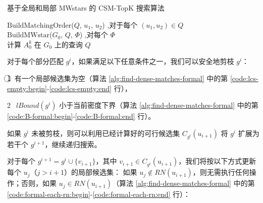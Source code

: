 \begin{algorithm}[H]
    \small
    \caption{基于全局和局部 MWstars 的 CSM-TopK 搜索算法}
    \label{alg:localmwstar:framework}
    $\mathrm{BuildMatchingOrder}$($Q$, $u_1$, $u_2$) ,对于每个 $(u_1, u_2) \in Q$ \\
    $\mathrm{BuildMWstar}$($G_0$, $Q$, $\Phi$) ,对每个 $\Phi$  \\
    计算 $A_0^k$ 在 $G_0$ 上的查询 $Q$ \\
    \end{algorithm}

对于每个部分匹配 $g^i$，如果满足以下任意条件之一，我们可以安全地剪枝 $g^i$：

\textcircled{1}~有一个局部候选集为空（算法 \ref{alg:find-dense-matches-formal} 中的第 \ref{code:lcs-empty:begin}-\ref{code:lcs-empty:end} 行），

\textcircled{2}~$lBound(g^i)$ 小于当前密度下界（算法 \ref{alg:find-dense-matches-formal} 中的第 \ref{code:B-formal:begin}-\ref{code:B-formal:end} 行）。

如果 $g^i$ 未被剪枝，则可以利用已经计算好的可行候选集 $C_{g^i}(u_{i+1})$ 将 $g^i$ 扩展为若干个 $g^{i+1}$，继续递归搜索。

对于每个 $g^{i+1} = g^i \cup \{v_{i+1}\}$，其中 $v_{i+1} \in C_{g^i}(u_{i+1})$，我们将按以下方式更新每个 $u_j$（$j > i+1$）的局部候选集：
如果 $u_j \notin RN(u_{i+1})$，则无需执行任何操作；否则，如果 $u_j \in RN(u_{i+1})$（算法 \ref{alg:find-dense-matches-formal} 中的第 \ref{code:formal-each-rn:begin}-\ref{code:formal-each-rn:end} 行）：

